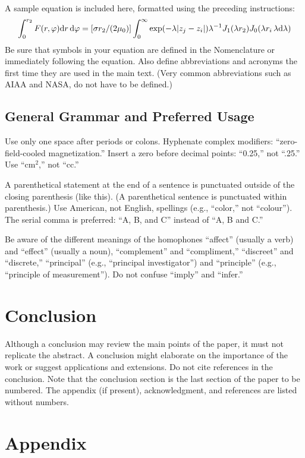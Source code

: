 \documentclass{AIAA}
\begin{document}
A sample equation is included here, formatted using the preceding instructions:
\begin{equation}
\int^{r_2}_0 F(r,\varphi){\rm d}r\,{\rm d}\varphi = [\sigma r_2/(2\mu_0)]\int^{\infty}_0\exp(-\lambda|z_j-z_i|)\lambda^{-1}J_1 (\lambda r_2)J_0 (\lambda r_i\,\lambda {\rm d}\lambda)
\end{equation}
Be sure that symbols in your equation are defined in the Nomenclature or immediately following the equation. Also define abbreviations and acronyms the first time they are used in the main text. (Very common abbreviations such as AIAA and NASA, do not have to be defined.)

\subsection{General Grammar and Preferred Usage}
Use only one space after periods or colons. Hyphenate complex modifiers: ``zero-field-cooled magnetization.'' Insert a zero before decimal points: ``0.25,'' not ``.25.'' Use ``cm$^{2}$,'' not ``cc.''

A parenthetical statement at the end of a sentence is punctuated outside of the closing parenthesis (like this). (A parenthetical sentence is punctuated within parenthesis.) Use American, not English, spellings (e.g., ``color,'' not ``colour''). The serial comma is preferred: ``A, B, and C'' instead of ``A, B and C.''

Be aware of the different meanings of the homophones ``affect'' (usually a verb) and ``effect'' (usually a noun), ``complement'' and ``compliment,'' ``discreet'' and ``discrete,'' ``principal'' (e.g., ``principal investigator'') and ``principle'' (e.g., ``principle of measurement''). Do not confuse ``imply'' and ``infer.''

\section{Conclusion}
Although a conclusion may review the main points of the paper, it must not replicate the abstract. A conclusion might elaborate on the importance of the work or suggest applications and extensions. Do not cite references in the conclusion. Note that the conclusion section is the last section of the paper to be numbered. The appendix (if present), acknowledgment, and references are listed without numbers.

\section*{Appendix}
\end{document}
